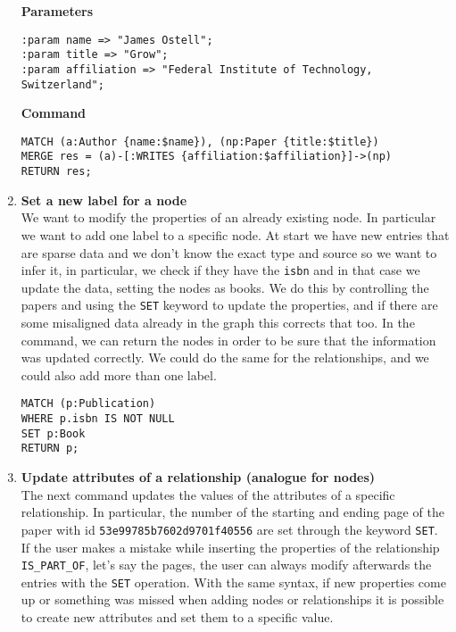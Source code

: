 \begin{enumerate}
    \textbf{Parameters}
    \begin{lstlisting}[label={lst:lstlisting10}]
:param name => "James Ostell";
:param title => "Grow";
:param affiliation => "Federal Institute of Technology, Switzerland";
    \end{lstlisting}
    \textbf{Command}
    \begin{lstlisting}[label={lst:lstlisting11}]
MATCH (a:Author {name:$name}), (np:Paper {title:$title})
MERGE res = (a)-[:WRITES {affiliation:$affiliation}]->(np)
RETURN res;
    \end{lstlisting}
    \item \textbf{Set a new label for a node}\\
    We want to modify the properties of an already existing node.
    In particular we want to add one label to a specific node.
    At start we have new entries that are sparse data and we don’t know the exact type and source so we want to infer it, in particular, we check if they have the \verb|isbn| and in that case we update the data, setting the nodes as books.
    We do this by controlling the papers and using the \verb|SET| keyword to update the properties, and if there are some misaligned data already in the graph this corrects that too.
    In the command, we can return the nodes in order to be sure that the information was updated correctly.
    We could do the same for the relationships, and we could also add more than one label.
    \begin{lstlisting}[label={lst:lstlisting12}]
MATCH (p:Publication)
WHERE p.isbn IS NOT NULL
SET p:Book
RETURN p;
    \end{lstlisting}
    \item \textbf{Update attributes of a relationship (analogue for nodes)}\\
    The next command updates the values of the attributes of a specific relationship.
    In particular, the number of the starting and ending page of the paper with id \verb|53e99785b7602d9701f40556| are set through the keyword \verb|SET|.
    If the user makes a mistake while inserting the properties of the relationship \verb|IS_PART_OF|, let's say the pages, the user can always modify afterwards the entries with the \verb|SET| operation.
    With the same syntax, if new properties come up or something was missed when adding nodes or relationships it is possible to create new attributes and set them to a specific value.


\end{enumerate}
